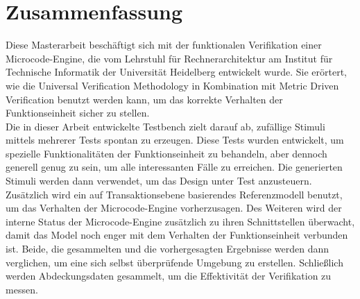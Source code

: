 \section*{Zusammenfassung}

Diese Masterarbeit beschäftigt sich mit der funktionalen Verifikation einer Microcode-Engine, die vom Lehrstuhl für Rechnerarchitektur am Institut
für Technische Informatik der Universität Heidelberg entwickelt wurde. Sie erörtert, wie die Universal Verification Methodology in Kombination mit Metric Driven
Verification benutzt werden kann, um das korrekte Verhalten der Funktionseinheit sicher zu stellen.\\
Die in dieser Arbeit entwickelte Testbench zielt darauf ab, zufällige Stimuli mittels mehrerer Tests spontan zu erzeugen.
Diese Tests wurden entwickelt, um spezielle Funktionalitäten der Funktionseinheit zu behandeln, aber dennoch generell genug zu sein, um alle interessanten
Fälle zu erreichen.
Die generierten Stimuli werden dann verwendet, um das Design unter Test anzusteuern.\\
Zusätzlich wird ein auf Transaktionsebene basierendes Referenzmodell benutzt, um das Verhalten der Microcode-Engine vorherzusagen.
Des Weiteren wird der interne Status der Microcode-Engine zusätzlich zu ihren Schnittstellen überwacht, damit das Model noch enger mit dem Verhalten der
Funktionseinheit verbunden ist. Beide, die gesammelten und die vorhergesagten Ergebnisse werden dann verglichen, um eine sich selbst überprüfende Umgebung zu
erstellen. Schließlich werden Abdeckungsdaten gesammelt, um die Effektivität der Verifikation zu messen.